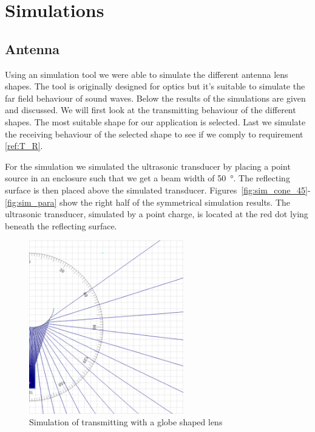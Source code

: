 \section{Simulations}

\subsection{Antenna}

Using an simulation tool \cite{Ultratool} we were able to simulate the different antenna lens shapes.
The tool is originally designed for optics but it's suitable to simulate the far field behaviour of sound waves.
Below the results of the simulations are given and discussed.
We will first look at the transmitting behaviour of the different shapes.
The most suitable shape for our application is selected.
Last we simulate the receiving behaviour of the selected shape to see if we comply to requirement \ref{ref:T_R}.

For the simulation we simulated the ultrasonic transducer by placing a point source in an enclosure such that we get a beam width of \SI{50}{\degree}.
The reflecting surface is then placed above the simulated transducer.
Figures~\ref{fig:sim_cone_45}-\ref{fig:sim_para} show the right half of the symmetrical simulation results.
The ultrasonic transducer, simulated by a point charge, is located at the red dot lying beneath the reflecting surface.

\begin{figure}[H]
\centering
\includegraphics[width=0.6\textwidth]{Figures/sim_globe.PNG}
\caption{Simulation of transmitting with a globe shaped lens}
\label{fig:sim_globe}
\end{figure}

